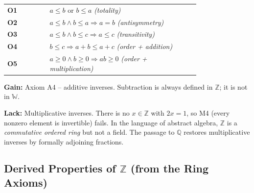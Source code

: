 \begin{tcolorbox}[colback=axiombox, colframe=axiomborder, arc=2pt,
  left=6pt, right=6pt, top=4pt, bottom=4pt,
  title={\small\textbf{Axioms for $\mathbb{Z}$ — Ordered Commutative Ring}},
  fonttitle=\small\bfseries]
\medskip
\begin{tabular}{@{} l p{0.78\linewidth} @{}}
\textbf{O1} & $a \leq b$ or $b \leq a$ \hfill\textit{(totality)} \\[3pt]
\textbf{O2} & $a \leq b \land b \leq a \Rightarrow a = b$
             \hfill\textit{(antisymmetry)} \\[3pt]
\textbf{O3} & $a \leq b \land b \leq c \Rightarrow a \leq c$
             \hfill\textit{(transitivity)} \\[3pt]
\textbf{O4} & $b \leq c \Rightarrow a + b \leq a + c$
             \hfill\textit{(order + addition)} \\[3pt]
\textbf{O5} & $a \geq 0 \land b \geq 0 \Rightarrow ab \geq 0$
             \hfill\textit{(order + multiplication)} \\
\end{tabular}
\end{tcolorbox}

\begin{remark}
\textbf{Gain:} Axiom A4 -- additive inverses. Subtraction is always defined
in $\mathbb{Z}$; it is not in $\mathbb{W}$.

\textbf{Lack:} Multiplicative inverses. There is no $x \in \mathbb{Z}$
with $2x = 1$, so M4 (every nonzero element is invertible) fails.
In the language of abstract algebra, $\mathbb{Z}$ is a
\emph{commutative ordered ring} but not a field.
The passage to $\mathbb{Q}$ restores multiplicative inverses by formally
adjoining fractions.
\end{remark}

\subsection{Derived Properties of $\mathbb{Z}$ (from the Ring Axioms)}

